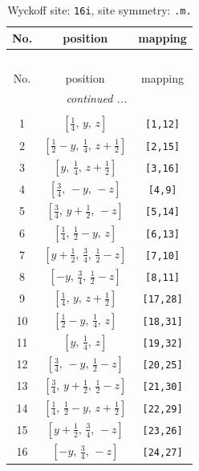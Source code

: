 \documentclass[fleqn,8pt]{jsarticle}
\begin{document}
\renewcommand{\arraystretch}{1.2}
\begin{longtable}{ccc}
\caption{Wyckoff site: {\tt 16i}, site symmetry: {\tt .m.}}
 \\
 \hline \hline
No. & position & mapping \\ \hline \endfirsthead

\multicolumn{2}{l}{\tablename\ \thetable{}} \\
 \hline \hline
No. & position & mapping \\ \hline \endhead

 \hline \hline
\multicolumn{2}{r}{\footnotesize\it continued ...} \\ \endfoot

 \hline \hline
\multicolumn{2}{r}{} \\ \endlastfoot

1 & $\left[ \frac{1}{4},\, y,\, z \right]$ & {\tt [1,12]} \\ \hline
2 & $\left[ \frac{1}{2} - y,\, \frac{1}{4},\, z + \frac{1}{2} \right]$ & {\tt [2,15]} \\ \hline
3 & $\left[ y,\, \frac{1}{4},\, z + \frac{1}{2} \right]$ & {\tt [3,16]} \\ \hline
4 & $\left[ \frac{3}{4},\, - y,\, - z \right]$ & {\tt [4,9]} \\ \hline
5 & $\left[ \frac{3}{4},\, y + \frac{1}{2},\, - z \right]$ & {\tt [5,14]} \\ \hline
6 & $\left[ \frac{1}{4},\, \frac{1}{2} - y,\, z \right]$ & {\tt [6,13]} \\ \hline
7 & $\left[ y + \frac{1}{2},\, \frac{3}{4},\, \frac{1}{2} - z \right]$ & {\tt [7,10]} \\ \hline
8 & $\left[ - y,\, \frac{3}{4},\, \frac{1}{2} - z \right]$ & {\tt [8,11]} \\ \hline
9 & $\left[ \frac{1}{4},\, y,\, z + \frac{1}{2} \right]$ & {\tt [17,28]} \\ \hline
10 & $\left[ \frac{1}{2} - y,\, \frac{1}{4},\, z \right]$ & {\tt [18,31]} \\ \hline
11 & $\left[ y,\, \frac{1}{4},\, z \right]$ & {\tt [19,32]} \\ \hline
12 & $\left[ \frac{3}{4},\, - y,\, \frac{1}{2} - z \right]$ & {\tt [20,25]} \\ \hline
13 & $\left[ \frac{3}{4},\, y + \frac{1}{2},\, \frac{1}{2} - z \right]$ & {\tt [21,30]} \\ \hline
14 & $\left[ \frac{1}{4},\, \frac{1}{2} - y,\, z + \frac{1}{2} \right]$ & {\tt [22,29]} \\ \hline
15 & $\left[ y + \frac{1}{2},\, \frac{3}{4},\, - z \right]$ & {\tt [23,26]} \\ \hline
16 & $\left[ - y,\, \frac{3}{4},\, - z \right]$ & {\tt [24,27]} \\
\end{longtable}
\end{document}
